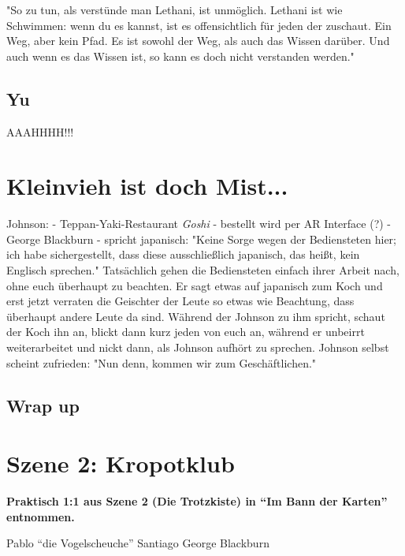     "So zu tun, als verstünde man Lethani, ist unmöglich. Lethani ist wie Schwimmen: wenn du es kannst, ist es offensichtlich für jeden der zuschaut. Ein Weg, aber kein Pfad. Es ist sowohl der Weg, als auch das Wissen darüber. Und auch wenn es das Wissen ist, so kann es doch nicht verstanden werden."


\subsection{Yu}
    AAAHHHH!!!
    
    
    
    
\section{Kleinvieh ist doch Mist...}

    Johnson:
    - Teppan-Yaki-Restaurant \textit{Goshi} - bestellt wird per AR Interface (?)
    - George Blackburn
    - spricht japanisch: "Keine Sorge wegen der Bediensteten hier; ich habe sichergestellt, dass diese ausschließlich japanisch, das heißt, kein Englisch sprechen." Tatsächlich gehen die Bediensteten einfach ihrer Arbeit nach, ohne euch überhaupt zu beachten. Er sagt etwas auf japanisch zum Koch und erst jetzt verraten die Geischter der Leute so etwas wie Beachtung, dass überhaupt andere Leute da sind. Während der Johnson zu ihm spricht, schaut der Koch ihn an, blickt dann kurz jeden von euch an, während er unbeirrt weiterarbeitet und nickt dann, als Johnson aufhört zu sprechen. Johnson selbst scheint zufrieden: "Nun denn, kommen wir zum Geschäftlichen."
    

\subsection{Wrap up}


\section{Szene 2: Kropotklub}

\textbf{Praktisch 1:1 aus Szene 2 (Die Trotzkiste) in ``Im Bann der Karten'' entnommen.}

Pablo ``die Vogelscheuche'' Santiago
George Blackburn



